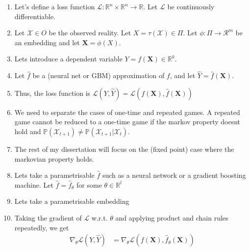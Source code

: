 \documentclass{article}
\begin{document}
\begin{enumerate}
        Since we proved that there is a function that is injective and surjective, the function is bijective and we are happy.

    \item Let's define a loss function $\mathcal L: \mathbb R^n \times \mathbb R^n \to \mathbb R$. Let $\mathcal L$ be continuously differentiable.
    
    \item Let $\mathcal X \in O$ be the observed reality. Let $X = \tau(\mathcal X) \in \Pi$. Let $\phi: \Pi \to \mathcal R ^ m$ be an embedding and let $\mathbf X = \phi (X)$.
    
    \item Lets introduce a dependent variable $Y = f(\mathbf X) \in \mathbb R ^k$.
    
    \item Let $\hat f$ be a (neural net or GBM) approximation of $f$, and let $\hat Y = \hat f (\mathbf X)$.
    
    \item Thus, the loss function is $\mathcal L(Y, \hat Y) = \mathcal L(f(\mathbf X), \hat f (\mathbf X))$
    
    \item We need to separate the cases of one-time and repeated games. A repeated game cannot be reduced to a one-time game if the markov property doesnt hold and $\mathbb P(\mathcal X_{t+1}) \neq \mathbb P (\mathcal X_{t+1} | \mathcal X_t)$.
    
    \item The rest of my dissertation will focus on the (fixed point) case where the markovian property holds.
    
    \item Lets take a parametrisable $\hat f$ such as a neural network or a gradient boosting machine. Let $\hat f = \hat f _ \theta$ for some $\theta \in \mathbb R ^ l$
    
    \item Lets take a parametrisable embedding

    \item Taking the gradient of $\mathcal L$ w.r.t. $\theta$ and applying product and chain rules repeatedly, we get 
    \begin{align}
      \nabla_\theta \mathcal L(Y, \hat Y) &= \nabla_\theta \mathcal L(f(\mathbf X), \hat f_\theta (\mathbf X)) \\  
    \end{align}
    
\end{enumerate}
\end{document}
